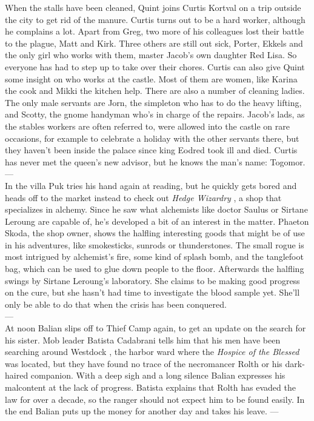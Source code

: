 When the stalls have been cleaned, Quint joins Curtis Kortval on a trip outside the city to get rid of the manure. Curtis turns out to be a hard worker, although he complains a lot. Apart from Greg, two more of his colleagues lost their battle to the plague, Matt and Kirk. Three others are still out sick, Porter, Ekkels and the only girl who works with them, master Jacob's own daughter Red Lisa. So everyone has had to step up to take over their chores. Curtis can also give Quint some insight on who works at the castle. Most of them are women, like Karina the cook and Mikki the kitchen help. There are also a number of cleaning ladies. The only male servants are Jorn, the simpleton who has to do the heavy lifting, and Scotty, the gnome handyman who's in charge of the repairs. Jacob's lads, as the stables workers are often referred to, were allowed into the castle on rare occasions, for example to celebrate a holiday with the other servants there, but they haven't been inside the palace since king Eodred took ill and died. Curtis has never met the queen's new advisor, but he knows the man's name: Togomor.\\

---\\

In the villa Puk tries his hand again at reading, but he quickly gets bored and heads off to the market instead to check out {\itshape Hedge Wizardry} , a shop that specializes in alchemy. Since he saw what alchemists like doctor Saulus or Sirtane Leroung are capable of, he's developed a bit of an interest in the matter. Phaeton Skoda, the shop owner, shows the halfling interesting goods that might be of use in his adventures, like smokesticks, sunrods or thunderstones. The small rogue is most intrigued by alchemist's fire, some kind of splash bomb, and the tanglefoot bag, which can be used to glue down people to the floor. Afterwards the halfling swings by Sirtane Leroung's laboratory. She claims to be making good progress on the cure, but she hasn't had time to investigate the blood sample yet. She'll only be able to do that when the crisis has been conquered.\\

---\\

At noon Balian slips off to Thief Camp again, to get an update on the search for his sister. Mob leader Batista Cadabrani tells him that his men have been searching around Westdock , the harbor ward where the {\itshape Hospice of the Blessed} was located, but they have found no trace of the necromancer Rolth or his dark-haired companion. With a deep sigh and a long silence Balian expresses his malcontent at the lack of progress. Batista explains that Rolth has evaded the law for over a decade, so the ranger should not expect him to be found easily. In the end Balian puts up the money for another day and takes his leave. ---\\

